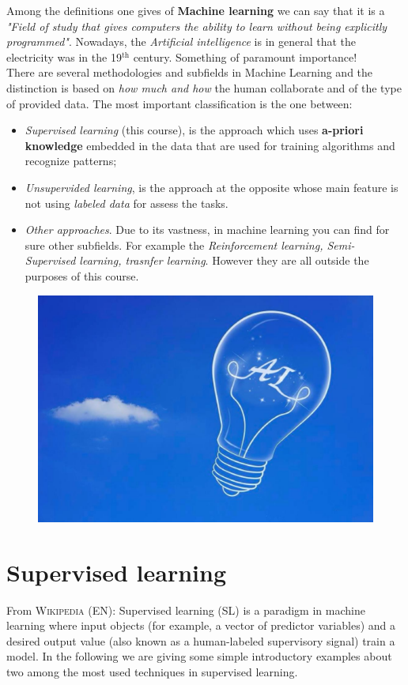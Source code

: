 Among the definitions one gives of \textbf{Machine learning} we can say that it is a \textit{"Field of study that gives computers the ability to learn without being explicitly programmed"}. Nowadays, the \textit{Artificial intelligence} is in general that the electricity was in the 19$^\text{th}$ century. Something of paramount importance! \\
There are several methodologies and subfields in Machine Learning and the distinction is based on \textit{how much and how} the human collaborate and of the type of provided data. The most important classification is the one between:
\begin{itemize}
    \itemsep-0.3em
    \item \textit{Supervised learning} (this course), is the approach which uses \textbf{a-priori knowledge} embedded in the data that are used for training algorithms and recognize patterns;
    \item \textit{Unsupervided learning}, is the approach at the opposite whose main feature is not using \textit{labeled data} for assess the tasks.
    \item \textit{Other approaches}. Due to its vastness, in machine learning you can find for sure other subfields. For example the \textit{Reinforcement learning, Semi-Supervised learning, trasnfer learning}. However they are all outside the purposes of this course. 
\end{itemize}

\begin{figure}[h]
    \centering
    \includegraphics[scale=0.2]{img/AI.jpeg}
\end{figure}

\section{Supervised learning}
From \textsc{Wikipedia (EN)}: \textsf{Supervised learning (SL) is a paradigm in machine learning where input objects (for example, a vector of predictor variables) and a desired output value (also known as a human-labeled supervisory signal) train a model.} In the following we are giving some simple introductory examples about two among the most used techniques in supervised learning.
